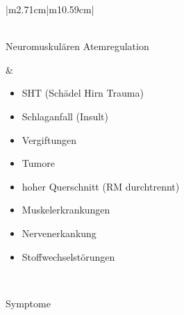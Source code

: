 \documentclass{article}
\begin{document}
\begin{center}
\begin{supertabular}{|m{2.71cm}|m{10.59cm}|}
\begin{itemize}
\end{itemize}
\\\hline
Neuromuskul\"aren Atemregulation

 &
\begin{itemize}
\item {\mdseries SHT (Sch\"adel Hirn Trauma)}

\item {\mdseries Schlaganfall (Insult)}

\item {\mdseries Vergiftungen}

\item {\mdseries Tumore}

\item {\mdseries hoher Querschnitt (RM durchtrennt)}

\item {\mdseries Muskelerkrankungen}

\item {\mdseries Nervenerkankung}

\item {\mdseries Stoffwechselst\"orungen}

\end{itemize}
\\\hline
\end{supertabular}
\end{center}
{\mdseries\color{black}
Symptome}
\end{document}
